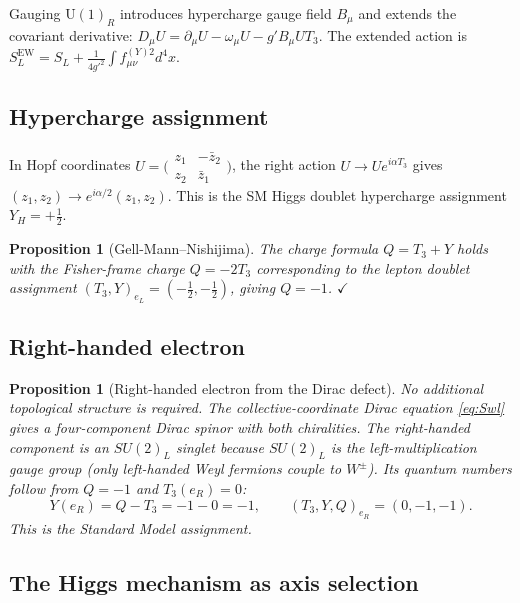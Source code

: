 \documentclass[12pt]{article}
\newtheorem{proposition}[theorem]{Proposition}
\theoremstyle{definition}
\theoremstyle{remark}
\begin{document}
Gauging $\mathrm{U}(1)_R$ introduces hypercharge gauge field $B_\mu$ and
extends the covariant derivative:
$D_\mu U=\partial_\mu U-\omega_\mu U - g'B_\mu U T_3$.
The extended action is $S_L^{\mathrm{EW}}=S_L+\frac{1}{4g'^2}\int f_{\mu\nu}^{(Y)2}d^4x$.

\subsection{Hypercharge assignment}

In Hopf coordinates $U=\bigl(\begin{smallmatrix}z_1&-\bar z_2\\z_2&\bar z_1\end{smallmatrix}\bigr)$,
the right action $U\to Ue^{i\alpha T_3}$ gives $(z_1,z_2)\to e^{i\alpha/2}(z_1,z_2)$.
This is the SM Higgs doublet hypercharge assignment $Y_H=+\tfrac{1}{2}$.

\begin{proposition}[Gell-Mann--Nishijima]
The charge formula $Q=T_3+Y$ holds with the Fisher-frame charge $Q=-2T_3$
corresponding to the lepton doublet assignment $(T_3,Y)_{e_L}=(-\tfrac{1}{2},-\tfrac{1}{2})$,
giving $Q=-1$. $\checkmark$
\end{proposition}

\subsection{Right-handed electron}

\begin{proposition}[Right-handed electron from the Dirac defect]
No additional topological structure is required.  The collective-coordinate
Dirac equation \eqref{eq:Swl} gives a four-component Dirac spinor with both
chiralities.  The right-handed component is an $SU(2)_L$ singlet because
$SU(2)_L$ is the left-multiplication gauge group (only left-handed Weyl
fermions couple to $W^\pm$).  Its quantum numbers follow from
$Q=-1$ and $T_3(e_R)=0$:
\begin{equation}
Y(e_R)=Q-T_3=-1-0=-1,\qquad
(T_3,Y,Q)_{e_R}=(0,-1,-1).
\end{equation}
This is the Standard Model assignment.
\end{proposition}

\subsection{The Higgs mechanism as axis selection}
\end{document}
